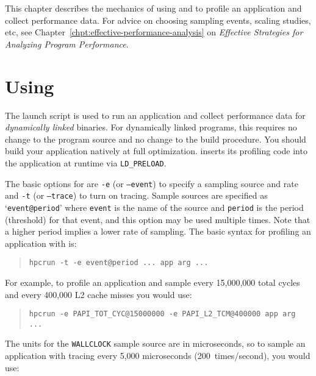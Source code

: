 
This chapter describes the mechanics of using \hpcrun{} and \hpclink{}
to profile an application and collect performance data.  For advice on
choosing sampling events, scaling studies, etc, see
Chapter~\ref{chpt:effective-performance-analysis} on {\it Effective
Strategies for Analyzing Program Performance}.

\section{Using \hpcrun{}}

The \hpcrun{} launch script is used to run an application and collect
performance data for {\it dynamically linked\/} binaries.  For
dynamically linked programs, this requires no change to the program
source and no change to the build procedure.  You should build your
application natively at full optimization.  \hpcrun{} inserts its
profiling code into the application at runtime via \verb|LD_PRELOAD|.

The basic options for \hpcrun{} are {\tt -e} (or {\tt --event}) to
specify a sampling source and rate and {\tt -t} (or {\tt --trace}) to
turn on tracing.  Sample sources are specified as `{\tt event@period}'
where {\tt event} is the name of the source and {\tt period} is the
period (threshold) for that event, and this option may be used
multiple times.  Note that a higher period implies a lower rate of
sampling.  The basic syntax for profiling an application with
\hpcrun{} is:

\begin{quote}
\begin{verbatim}
hpcrun -t -e event@period ... app arg ...
\end{verbatim}
\end{quote}

For example, to profile an application and sample every 15,000,000
total cycles and every 400,000 L2 cache misses you would use:

\begin{quote}
\begin{verbatim}
hpcrun -e PAPI_TOT_CYC@15000000 -e PAPI_L2_TCM@400000 app arg ...
\end{verbatim}
\end{quote}

The units for the {\tt WALLCLOCK} sample source are in microseconds,
so to sample an application with tracing every 5,000 microseconds
(200~times/second), you would use:

